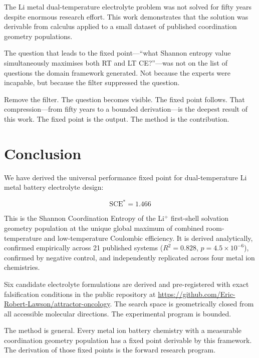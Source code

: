 \documentclass[11pt]{article}
\theoremstyle{plain}
\theoremstyle{definition}
\theoremstyle{remark}
\begin{document}
The Li metal dual-temperature electrolyte problem was not solved for fifty years
despite enormous research effort.  This work demonstrates that the solution was
derivable from calculus applied to a small dataset of published coordination
geometry populations.

The question that leads to the fixed point---``what Shannon entropy value
simultaneously maximises both RT and LT CE?''---was not on the list of questions
the domain framework generated.  Not because the experts were incapable, but
because the filter suppressed the question.

Remove the filter.  The question becomes visible.  The fixed point follows.
That compression---from fifty years to a bounded derivation---is the deepest
result of this work.  The fixed point is the output.  The method is the
contribution.

\section{Conclusion}

We have derived the universal performance fixed point for dual-temperature
Li metal battery electrolyte design:

\begin{equation}
  \mathrm{SCE}^{*} = 1.466
\end{equation}

This is the Shannon Coordination Entropy of the Li$^+$ first-shell solvation
geometry population at the unique global maximum of combined room-temperature
and low-temperature Coulombic efficiency.  It is derived analytically, confirmed
empirically across 21 published systems ($R^2 = 0.828$, $p = 4.5\times10^{-6}$),
confirmed by negative control, and independently replicated across four metal
ion chemistries.

Six candidate electrolyte formulations are derived and pre-registered with exact
falsification conditions in the public repository at
\url{https://github.com/Eric-Robert-Lawson/attractor-oncology}.
The search space is geometrically closed from all accessible molecular directions.
The experimental program is bounded.

The method is general.  Every metal ion battery chemistry with a measurable
coordination geometry population has a fixed point derivable by this framework.
The derivation of those fixed points is the forward research program.
\end{document}
